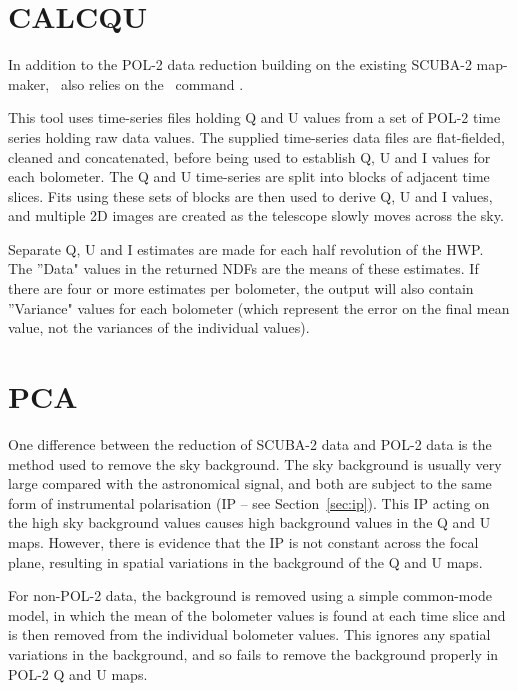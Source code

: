 \section{CALCQU}
\label{sec:calcqu}

In addition to the POL-2 data reduction building on the
existing SCUBA-2 map-maker, \poltwomap\ also relies on the \SMURF\
command .

This  tool uses time-series files holding Q
and U values from a set of POL-2 time series holding raw data values.
The supplied time-series data files are flat-fielded, cleaned and concatenated,
before being used to establish Q, U and I values for each bolometer. The Q
and U time-series are split into blocks of adjacent time slices. Fits
using these sets of blocks are then used to derive Q, U and I values, and
multiple 2D images are created as the telescope slowly moves across the sky.

Separate Q, U and I estimates are made for each half revolution of the HWP.
The ''Data" values in the returned NDFs are the means of these estimates. If
there are four or more estimates per bolometer, the output will also contain
''Variance" values for each bolometer (which represent the error on
the final mean value, not the variances of the individual values).

\section{PCA}
\label{sec:pca}

One difference between the reduction of SCUBA-2 data and POL-2 data is the
method used to remove the sky background.  The sky background is usually
very large compared with the astronomical signal, and both are subject to
the same form of instrumental polarisation (IP -- see Section~\ref{sec:ip}).
This
IP acting on the high sky background values causes high background values
in the Q and U maps. However, there is evidence that the IP is not
constant across the focal plane, resulting in spatial variations in the
background of the Q and U maps.

For non-POL-2 data, the background is removed using a simple common-mode
model, in which the mean of the bolometer values is found at each time
slice and is then removed from the individual bolometer values. This
ignores any spatial variations in the background, and so fails to remove
the background properly in POL-2 Q and U maps.


